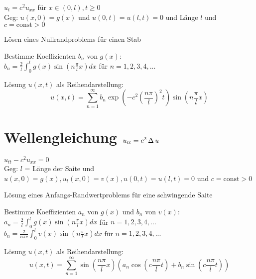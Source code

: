 \documentclass[german,color,5pt]{latex4ei/latex4ei_fs}
\begin{document}
\begin{sectionbox}
	\(u_{t}=c^{2}u_{xx}\) für \(x \in (0,l), t\geq 0\) \\
	Geg: \(u(x,0)=g(x)\) und \(u(0,t)=u(l,t)=0\) und Länge \(l\) und \(c=\mathrm{const}>0\)
	\begin{cookbox}{Lösen eines Nullrandproblems für einen Stab}
		\item Bestimme Koeffizienten \(b_{n}\) von \(g(x)\): \\
		\(b_{n}=\frac{2}{l} \int_{0}^{l} g(x)\sin\left(n\frac{\pi}{l}x\right)dx\) \qquad für \(n=1,2,3,4,... \)
		\item Lösung \(u(x,t)\) als Reihendarstellung: \vspace{-5pt}		 %
		\[u(x,t)=\sum_{n=1}^{\infty} b_{n} \exp\left(-c^{2}\left(\frac{n\pi}{l}\right)^{2}t\right)\sin\left(n\frac{\pi}{l}x\right)\]
	\end{cookbox}
\end{sectionbox}

\section{Wellengleichung \quad \(u_{tt}=c^{2} \operatorname{\Delta}{u} \)}
\begin{sectionbox}
\(u_{tt}-c^{2} u_{xx}=0\) \\
Geg: \(l\) = Länge der Saite und \(u(x,0)=g(x), u_{t}(x,0)=v(x), u(0,t)=u(l,t)=0\) und \(c=\mathrm{const}>0 \)
\begin{cookbox}{Lösung eines Anfangs-Randwertproblems für eine schwingende Saite}
\item Bestimme Koeffizienten \(a_{n}\) von \(g(x)\) und \(b_{n}\) von \(v(x)\): \\
\(a_{n}=\frac{2}{l}\int_0^l  g(x)\sin\left(n\frac{\pi}{l}x\right)dx\) \qquad für \(n=1,2,3,4,... \)\\
\(b_{n}=\frac{2}{n\pi c} \int_0^l  v(x)\sin\left(n\frac{\pi}{l}x\right)dx\) \qquad für \(n=1,2,3,4,... \)
\item Lösung \(u(x,t)\) als Reihendarstellung: \vspace{-5pt}		 								%
\[u\left(x,t\right)= \sum_{n=1}^{\infty} \sin\left(\frac{n \pi}{l}x\right)\left(a_{n}\cos\left(c\frac{n\pi}{l}t\right)+b_{n}\sin\left(c\frac{n\pi}{l}t\right)\right)\]
\end{cookbox}
\end{sectionbox}

\vspace{-1cm} 							%

\end{document}
